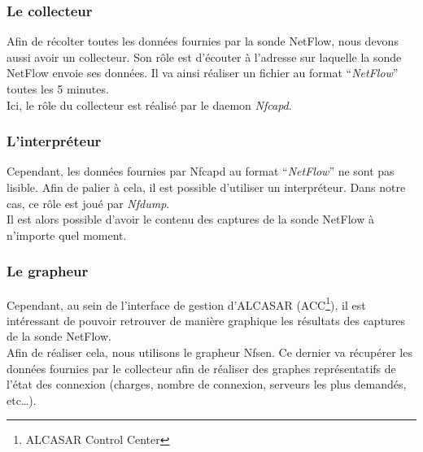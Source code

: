 \subsubsection{Le collecteur}
Afin de récolter toutes les données fournies par la sonde NetFlow, nous devons aussi avoir un collecteur. Son rôle est d'écouter à l'adresse sur laquelle la sonde NetFlow envoie ses données. Il va ainsi réaliser un fichier au format \enquote{\textit{NetFlow}} toutes les 5 minutes.\\
Ici, le rôle du collecteur est réalisé par le daemon \textit{Nfcapd}.
\subsubsection{L'interpréteur}
Cependant, les données fournies par Nfcapd au format \enquote{\textit{NetFlow}} ne sont pas lisible. Afin de palier à cela, il est possible d'utiliser un interpréteur. Dans notre cas, ce rôle est joué par \textit{Nfdump}.\\
Il est alors possible d'avoir le contenu des captures de la sonde NetFlow à n'importe quel moment.
\subsubsection{Le grapheur}
Cependant, au sein de l'interface de gestion d'ALCASAR (ACC\footnote{ALCASAR Control Center}), il est intéressant de pouvoir retrouver de manière graphique les résultats des captures de la sonde NetFlow.\\
Afin de réaliser cela, nous utilisons le grapheur Nfsen. Ce dernier va récupérer les données fournies par le collecteur afin de réaliser des graphes représentatifs de l'état des connexion (charges, nombre de connexion, serveurs les plus demandés, etc\ldots).

